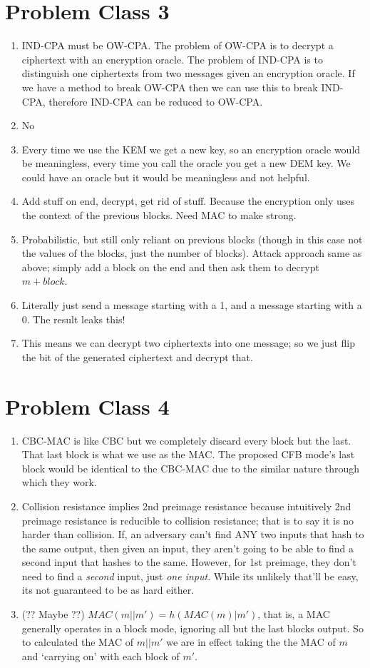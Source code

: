 \section{Problem Class 3}
	\begin{enumerate}
		\item IND-CPA must be OW-CPA. The problem of OW-CPA is to decrypt a ciphertext with an encryption oracle. The problem of IND-CPA is to distinguish one ciphertexts from two messages given an encryption oracle. If we have a method to break OW-CPA then we can use this to break IND-CPA, therefore IND-CPA can be reduced to OW-CPA.
		\item No
		\item Every time we use the KEM we get a new key, so an encryption oracle would be meaningless, every time you call the oracle you get a new DEM key. We could have an oracle but it would be meaningless and not helpful.

		\item Add stuff on end, decrypt, get rid of stuff. Because the encryption only uses the context of the previous blocks. Need MAC to make strong.
		\item Probabilistic, but still only reliant on previous blocks (though in this case not the values of the blocks, just the number of blocks). Attack approach same as above; simply add a block on the end and then ask them to decrypt $m+block$.
		\item Literally just send a message starting with a 1, and a message starting with a 0. The result leaks this!
		\item This means we can decrypt two ciphertexts into one message; so we just flip the bit of the generated ciphertext and decrypt that.
	\end{enumerate}

\section{Problem Class 4}
	\begin{enumerate}
		\item CBC-MAC is like CBC but we completely discard every block but the last. That last block is what we use as the MAC. The proposed CFB mode's last block would be identical to the CBC-MAC due to the similar nature through which they work.
		\item Collision resistance implies 2nd preimage resistance because intuitively 2nd preimage resistance is reducible to collision resistance; that is to say it is no harder than collision. If, an adversary can't find ANY two inputs that hash to the same output, then given an input, they aren't going to be able to find a second input that hashes to the same. However, for 1st preimage, they don't need to find a \textit{second} input, just \textit{one input}. While its unlikely that'll be easy, its not guaranteed to be as hard either.
		\item (?? Maybe ??) $MAC(m||m') = h(MAC(m)|m')$, that is, a MAC generally operates in a block mode, ignoring all but the last blocks output. So to calculated the MAC of $m||m'$ we are in effect taking the the MAC of $m$ and `carrying on' with each block of $m'$.
	\end{enumerate}

